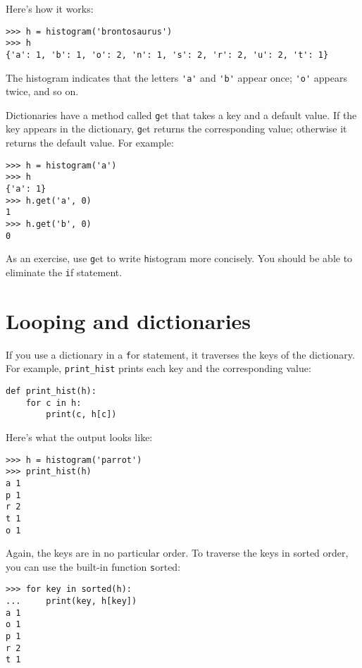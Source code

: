 \documentclass[
DIV=11,
fontsize=13,
twoside,
headinclude=false,
titlepage=firstiscover,
abstract=true,
headsepline=true,
footsepline=true,
chapterprefix=true, %
headings=big,
bibliography=totoc,%
captions=tableheading
]{scrbook}
\theoremstyle{definition}
\begin{document}
Here's how it works:

\begin{lstlisting}
>>> h = histogram('brontosaurus')
>>> h
{'a': 1, 'b': 1, 'o': 2, 'n': 1, 's': 2, 'r': 2, 'u': 2, 't': 1}
\end{lstlisting}
%
The histogram indicates that the letters \verb"'a'" and \verb"'b'"
appear once; \verb"'o'" appears twice, and so on.


Dictionaries have a method called {\texttt get} that takes a key
and a default value.  If the key appears in the dictionary,
{\texttt get} returns the corresponding value; otherwise it returns
the default value.  For example:

\begin{lstlisting}
>>> h = histogram('a')
>>> h
{'a': 1}
>>> h.get('a', 0)
1
>>> h.get('b', 0)
0
\end{lstlisting}
%
As an exercise, use {\texttt get} to write {\texttt histogram} more concisely.  You
should be able to eliminate the {\texttt if} statement.


\section{Looping and dictionaries}

If you use a dictionary in a {\texttt for} statement, it traverses
the keys of the dictionary.  For example, \verb"print_hist"
prints each key and the corresponding value:

\begin{lstlisting}
def print_hist(h):
    for c in h:
        print(c, h[c])
\end{lstlisting}
%
Here's what the output looks like:

\begin{lstlisting}
>>> h = histogram('parrot')
>>> print_hist(h)
a 1
p 1
r 2
t 1
o 1
\end{lstlisting}
%
Again, the keys are in no particular order.  To traverse the keys
in sorted order, you can use the built-in function {\texttt sorted}:

\begin{lstlisting}
>>> for key in sorted(h):
...     print(key, h[key])
a 1
o 1
p 1
r 2
t 1
\end{lstlisting}

\end{document}
